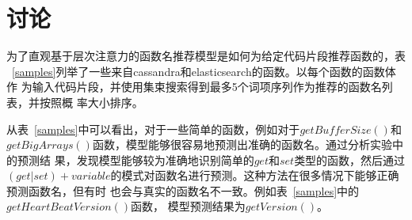 \section{讨论}

为了直观基于层次注意力的函数名推荐模型是如何为给定代码片段推荐函数的，表
~\ref{samples}列举了一些来自cassandra和elasticsearch的函数。以每个函数的函数体作
为输入代码片段，并使用集束搜索得到最多5个词项序列作为推荐的函数名列表，并按照概
率大小排序。

从表~\ref{samples}中可以看出，对于一些简单的函数，例如对于$getBufferSize()$和
$getBigArrays()$函数，模型能够很容易地预测出准确的函数名。通过分析实验中的预测结
果，发现模型能够较为准确地识别简单的$get$和$set$类型的函数，然后通过$(get|set)+
variable$的模式对函数名进行预测。这种方法在很多情况下能够正确预测函数名，但有时
也会与真实的函数名不一致。例如表~\ref{samples}中的$getHeartBeatVersion()$函数，
模型预测结果为$getVersion()$。


